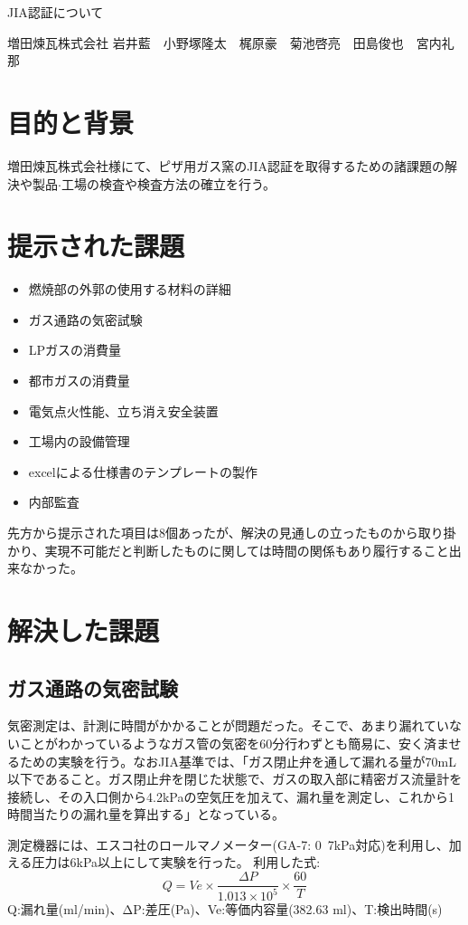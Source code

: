 \documentclass[upLaTeX,11pt]{ujarticle}
\begin{document}
\begin{center}
    {\LARGE JIA認証について}
\begin{flushright}
    増田煉瓦株式会社
    岩井藍　小野塚隆太　梶原豪　菊池啓亮　田島俊也　宮内礼那
\end{flushright}
\end{center}
\section{目的と背景}
増田煉瓦株式会社様にて、ピザ用ガス窯のJIA認証を取得するための諸課題の解決や製品$\cdot$工場の検査や検査方法の確立を行う。
\section{提示された課題}
\begin{itemize}
\item 燃焼部の外郭の使用する材料の詳細
\item ガス通路の気密試験
\item LPガスの消費量
\item 都市ガスの消費量
\item 電気点火性能、立ち消え安全装置
\item 工場内の設備管理
\item excelによる仕様書のテンプレートの製作
\item 内部監査
\end{itemize}
先方から提示された項目は8個あったが、解決の見通しの立ったものから取り掛かり、実現不可能だと判断したものに関しては時間の関係もあり履行すること出来なかった。
\section{解決した課題}
\subsection{ガス通路の気密試験}
気密測定は、計測に時間がかかることが問題だった。そこで、あまり漏れていないことがわかっているようなガス管の気密を60分行わずとも簡易に、安く済ませるための実験を行う。なおJIA基準では、「ガス閉止弁を通して漏れる量が70mL以下であること。ガス閉止弁を閉じた状態で、ガスの取入部に精密ガス流量計を接続し、その入口側から4.2kPaの空気圧を加えて、漏れ量を測定し、これから1時間当たりの漏れ量を算出する」となっている。

測定機器には、エスコ社のロールマノメーター(GA-7: 0~7kPa対応)を利用し、加える圧力は6kPa以上にして実験を行った。
利用した式:
\begin{equation*}
    Q=Ve\times\frac{\Delta P}{1.013\times10^5}\times\frac{60}{T}
\end{equation*}
Q:漏れ量(ml/min)、ΔP:差圧(Pa)、Ve:等価内容量(382.63 ml)、T:検出時間(s)
\end{document}
